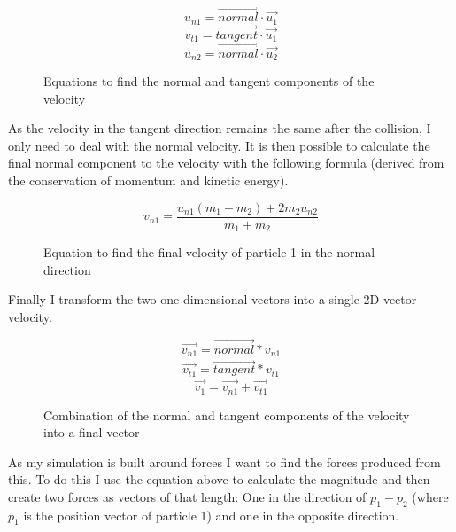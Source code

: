 	\begin{figure}[h!]
		\begin{equation}
			u_{n1} = \vec{normal} \cdot \vec{u_1}
		\end{equation}
		\begin{equation}
			v_{t1} = \vec{tangent} \cdot \vec{u_1}
		\end{equation}
		\begin{equation}
			u_{n2} = \vec{normal} \cdot \vec{u_2}
		\end{equation}
		\caption{Equations to find the normal and tangent components of the velocity}
		\label{fig:compEqn}
	\end{figure}
		
	As the velocity in the tangent direction remains the same after the collision, I only need to deal with the normal velocity. It is then possible to calculate the final normal component to the velocity with the following formula (derived from the conservation of momentum and kinetic energy).
	\begin{figure}[h!]
		\begin{equation}
			v_{n1} = \frac{u_{n1}(m_1 - m_2) + 2 m_2 u_{n2}}{m_1+m_2}
		\end{equation}
		\caption{Equation to find the final velocity of particle 1 in the normal direction}
		\label{fig:colEqn}
	\end{figure}

	\newpage
	
	Finally I transform the two one-dimensional vectors into a single 2D vector velocity.
	
	\begin{figure}[h]
		\begin{equation}
			\vec{v_{n1}} = \vec{normal} * v_{n1}
		\end{equation}
		\begin{eqnarray}
			\vec{v_{t1}} = \vec{tangent} * v_{t1}
		\end{eqnarray}
		\begin{equation}
			\vec{v_1} = \vec{v_{n1}} + \vec{v_{t1}}
		\end{equation}
		\caption{Combination of the normal and tangent components of the velocity into a final vector}
		\label{fig:movEqn}
	\end{figure}

	As my simulation is built around forces I want to find the forces produced from this. To do this I use the equation above to calculate the magnitude and then create two forces as vectors of that length: One in the direction of $p_1-p_2$ (where $p_1$ is the position vector of particle 1) and one in the opposite direction.

